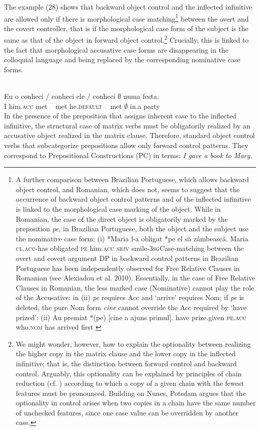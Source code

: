 \documentclass[output=paper]{langsci/langscibook}
\begin{document}
The example (28) shows that backward object control and the inflected infinitive are allowed only if there is morphological case matching\footnote{A further comparison between Brazilian Portuguese, which allows backward object control, and Romanian, which does not, seems to suggest that the occurrence of backward object control patterns and of the inflected infinitive is linked to the morphological case marking of the object. While in Romanian, the case of the direct object is obligatorily marked by the preposition \textit{pe}, in Brazilian Portuguese, both the object and the subject use the nominative case form: (i)  *Maria  l-a     obligat     *pe el            să      zâmbească.  Maria  \textsc{cl.acc}{}-has        obligated     \textsc{pe} him\textsc{.acc} \textsc{sbjv} smile\textsc{{}-3sg}Case-matching between the overt and covert argument DP in backward control patterns in Brazilian Portuguese has been independently observed for Free Relative Clauses in Romanian (see Alexiadou et al. 2010). Essentially, in the case of Free Relative Clauses in Romanian, the less marked case (Nominative) cannot play the role of the Accusative: in (ii) \textit{pe} requires Acc and ‘arrive’ requires Nom; if \textit{pe} is deleted, the pure Nom form \textit{cine} cannot override the Acc required by ‘have prized’: (ii)  Au    premiat       *(pe)     [cine        a     ajuns    primul].  have prize.given   \textsc{pe.acc}  who.\textsc{nom} has arrived first \citep{AlexiadouEtAl2010}} between the overt and the covert controller, that is if the morphological case form of the subject is the same as that of the object in forward object control.\footnote{We might wonder, however, how to explain the optionality between realizing the higher copy in the matrix clause and the lower copy in the inflected infinitive; that is, the distinction between forward control and backward control. Arguably, this optionality can be explained by principles of chain reduction (cf. \citealt{Nunes2004}) according to which a copy of a given chain with the fewest features must be pronounced. Building on Nunes, Potsdam argues that the optionality in control arises when two copies in a chain have the same number of unchecked features, since one case value can be overridden by another case.} Crucially, this is linked to the fact that morphological accusative case forms are disappearing in the colloquial language and being replaced by the corresponding nominative case forms.

\ea%
    \citep[328]{Farrell1990}\label{ex:moreno:29}\\
    \gll Eu  o       conheci \slash{} conheci ele        \slash{}  conheci {$\emptyset$} numa festa. \\
         I  him.\textsc{acc} met  ~  met  he.\textsc{default} ~ met   {$\emptyset$} in.a    party\\
\z
In the presence of the preposition that assigns inherent case to the inflected infinitive, the structural case of matrix verbs must be obligatorily realized by an accusative object realized in the matrix clause. Therefore, standard object control verbs that subcategorize prepositions allow only forward control patterns. They correspond to Prepositional Constructions (PC) in  terms: \textit{I gave a book to Mary.}
\end{document}
